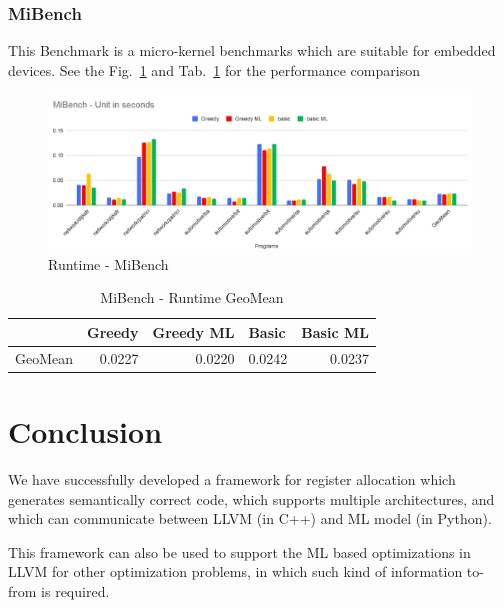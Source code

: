 \subsubsection{MiBench}
This Benchmark is a micro-kernel benchmarks which are suitable for embedded devices.  See the Fig.~\ref{fig:mlra-mibench} and Tab.~\ref{tab:mlra:mibench} for the performance comparison

\begin{figure}[t]
    \centering
    \includegraphics[scale=0.4]{figures/chapter-5/MiBench.png}
    \caption{Runtime - MiBench}
     \label{fig:mlra-mibench}
\end{figure}

\begin{table}[h]
\begin{tabular}{|l|l|l|l|l|}
\hline
 & \textbf{Greedy} & \textbf{Greedy ML} & \textbf{Basic} & \textbf{Basic ML} \\ \hline
GeoMean & \multicolumn{1}{r|}{0.0227} & \multicolumn{1}{r|}{0.0220} & \multicolumn{1}{r|}{0.0242} & \multicolumn{1}{r|}{0.0237} \\ \hline
\end{tabular}
\centering
\caption{MiBench - Runtime GeoMean}
\label{tab:mlra:mibench}
\end{table}


\section{Conclusion}\label{sec:mlra:conclusion}
We have successfully developed a framework for register allocation which generates semantically correct code, which supports multiple architectures, and which can communicate between LLVM (in C++) and ML model (in Python).

This framework can also be used to support the ML based optimizations in LLVM for other optimization problems, in which such kind of information to-from is required.

